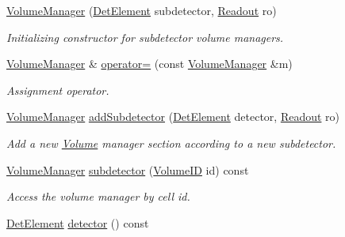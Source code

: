 \begin{DoxyCompactItemize}
\item 
\hyperlink{class_d_d4hep_1_1_geometry_1_1_volume_manager_ae1612218645bcd2734d83519d352aea9}{VolumeManager} (\hyperlink{class_d_d4hep_1_1_geometry_1_1_det_element}{DetElement} subdetector, \hyperlink{class_d_d4hep_1_1_geometry_1_1_readout}{Readout} ro)
\begin{DoxyCompactList}\small\item\em Initializing constructor for subdetector volume managers. \item\end{DoxyCompactList}\item 
\hyperlink{class_d_d4hep_1_1_geometry_1_1_volume_manager}{VolumeManager} \& \hyperlink{class_d_d4hep_1_1_geometry_1_1_volume_manager_ad81abecb3dd9f512683df8e41d84f2c9}{operator=} (const \hyperlink{class_d_d4hep_1_1_geometry_1_1_volume_manager}{VolumeManager} \&m)
\begin{DoxyCompactList}\small\item\em Assignment operator. \item\end{DoxyCompactList}\item 
\hyperlink{class_d_d4hep_1_1_geometry_1_1_volume_manager}{VolumeManager} \hyperlink{class_d_d4hep_1_1_geometry_1_1_volume_manager_a6a9318986cf6574d07eaa86ea4da5085}{addSubdetector} (\hyperlink{class_d_d4hep_1_1_geometry_1_1_det_element}{DetElement} detector, \hyperlink{class_d_d4hep_1_1_geometry_1_1_readout}{Readout} ro)
\begin{DoxyCompactList}\small\item\em Add a new \hyperlink{class_d_d4hep_1_1_geometry_1_1_volume}{Volume} manager section according to a new subdetector. \item\end{DoxyCompactList}\item 
\hyperlink{class_d_d4hep_1_1_geometry_1_1_volume_manager}{VolumeManager} \hyperlink{class_d_d4hep_1_1_geometry_1_1_volume_manager_aea4b44d4815c7fe573151d009082422b}{subdetector} (\hyperlink{class_d_d4hep_1_1_geometry_1_1_volume_manager_ab1f746b561c93be38bc7c6e66fc8ca8a}{VolumeID} id) const 
\begin{DoxyCompactList}\small\item\em Access the volume manager by cell id. \item\end{DoxyCompactList}\item 
\hyperlink{class_d_d4hep_1_1_geometry_1_1_det_element}{DetElement} \hyperlink{class_d_d4hep_1_1_geometry_1_1_volume_manager_a6cd7f039c11a3bafe055375ce449a83d}{detector} () const 

\end{DoxyCompactItemize}
